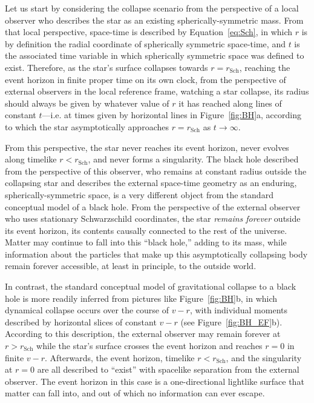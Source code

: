 \documentclass[aps,rmp,groupedaddress,twocolumn,10pt]{revtex4-2}
\begin{document}
Let us start by considering the collapse scenario from the perspective of a local observer who describes the star as an existing spherically-symmetric mass. From that local perspective, space-time is described by Equation~\ref{eq:Sch}, in which $r$ is by definition the radial coordinate of spherically symmetric space-time, and $t$ is the associated time variable in which spherically symmetric space was defined to exist. Therefore, as the star's surface collapses towards $r=r_{\mathrm{Sch}}$, reaching the event horizon in finite proper time on its own clock, from the perspective of external observers in the local reference frame, watching a star collapse, its radius should always be given by whatever value of $r$ it has reached along lines of constant $t$---i.e. at times given by horizontal lines in Figure~\ref{fig:BH}a, according to which the star asymptotically approaches $r=r_{\mathrm{Sch}}$ as $t\rightarrow\infty$.

From this perspective, the star never reaches its event horizon, never evolves along timelike $r<r_{\mathrm{Sch}}$, and never forms a singularity. The black hole described from the perspective of this observer, who remains at constant radius outside the collapsing star and describes the external space-time geometry as an enduring, spherically-symmetric space, is a very different object from the standard conceptual model of a black hole. From the perspective of the external observer who uses stationary Schwarzschild coordinates, the star \textit{remains forever} outside its event horizon, its contents causally connected to the rest of the universe. Matter may continue to fall into this ``black hole,'' adding to its mass, while information about the particles that make up this asymptotically collapsing body remain forever accessible, at least in principle, to the outside world.

In contrast, the standard conceptual model of gravitational collapse to a black hole is more readily inferred from pictures like Figure~\ref{fig:BH}b, in which dynamical collapse occurs over the course of $v-r$, with individual moments described by horizontal slices of constant $v-r$ (see Figure~\ref{fig:BH_EF}b). According to this description, the external observer may remain forever at $r>r_{\mathrm{Sch}}$ while the star's surface crosses the event horizon and reaches $r=0$ in finite $v-r$. Afterwards, the event horizon, timelike $r<r_{\mathrm{Sch}}$, and the singularity at $r=0$ are all described to ``exist'' with spacelike separation from the external observer. The event horizon in this case is a one-directional lightlike surface that matter can fall into, and out of which no information can ever escape. 
\end{document}
